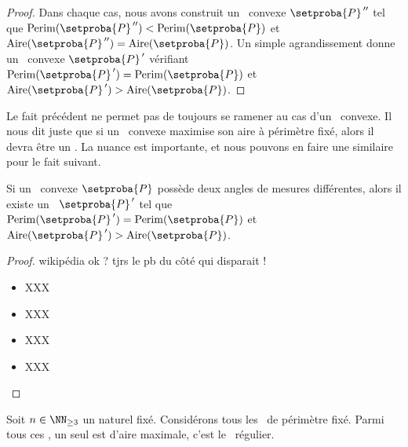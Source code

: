 \begin{proof}
	Dans chaque cas, nous avons construit un \ngone\ convexe $\setproba{P}^{\,\prime\prime}$ tel que 
	$\perim{\setproba{P}^{\,\prime\prime}} < \perim{\setproba{P}}$ 
	et 
	$\area{\setproba{P}^{\,\prime\prime}} = \area{\setproba{P}}$.
	Un simple agrandissement donne un \ngone\ convexe $\setproba{P}^{\,\prime}$ vérifiant
	$\perim{\setproba{P}^{\,\prime}} = \perim{\setproba{P}}$ 
	et 
	$\area{\setproba{P}^{\,\prime}} > \area{\setproba{P}}$.
\end{proof}


\begin{remark}
	Le fait précédent ne permet pas de toujours se ramener au cas d'un \niso\ convexe. Il nous dit juste que si un \ngone\ convexe maximise son aire à périmètre fixé, alors il devra être un \niso. La nuance est importante, et nous pouvons en faire une similaire pour le fait suivant.
\end{remark}




\begin{fact} \label{almost-reg-poly}
	Si un \niso\  convexe $\setproba{P}$ possède deux angles de mesures différentes,
	alors il existe un \ngone\ $\setproba{P}^{\,\prime}$ tel que
	$\perim{\setproba{P}^{\,\prime}} = \perim{\setproba{P}}$ 
	et 
	$\area{\setproba{P}^{\,\prime}} > \area{\setproba{P}}$.
\end{fact}


\begin{proof}
	wikipédia ok ? tjrs le pb du côté qui disparait !
	\begin{itemize}
		\item XXX

		\item XXX

		\item XXX

		\item XXX
	\end{itemize}
\end{proof}




\begin{fact}
	Soit $n \in \NN_{\geq3}$ un naturel fixé.
	Considérons tous les \ngones\  de périmètre fixé. Parmi tous ces \ngones, un seul est d'aire maximale, c'est le \ngone\ régulier.
\end{fact}



